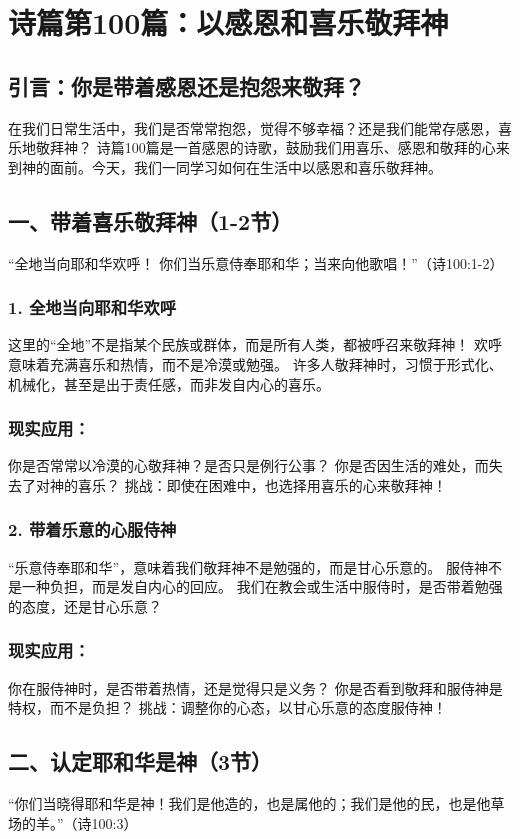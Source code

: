 \documentclass[a4paper, 12pt]{article}
\begin{document}
\section{诗篇第100篇：以感恩和喜乐敬拜神}
\subsection*{引言：你是带着感恩还是抱怨来敬拜？}
在我们日常生活中，我们是否常常抱怨，觉得不够幸福？还是我们能常存感恩，喜乐地敬拜神？
诗篇100篇是一首感恩的诗歌，鼓励我们用喜乐、感恩和敬拜的心来到神的面前。今天，我们一同学习如何在生活中以感恩和喜乐敬拜神。

\subsection*{一、带着喜乐敬拜神（1-2节）}
“全地当向耶和华欢呼！ 你们当乐意侍奉耶和华；当来向他歌唱！”（诗100:1-2）

\subsubsection*{1. 全地当向耶和华欢呼}
这里的“全地”不是指某个民族或群体，而是所有人类，都被呼召来敬拜神！
欢呼意味着充满喜乐和热情，而不是冷漠或勉强。
许多人敬拜神时，习惯于形式化、机械化，甚至是出于责任感，而非发自内心的喜乐。
\subsubsection*{现实应用：}

你是否常常以冷漠的心敬拜神？是否只是例行公事？
你是否因生活的难处，而失去了对神的喜乐？
挑战：即使在困难中，也选择用喜乐的心来敬拜神！

\subsubsection*{2. 带着乐意的心服侍神}
“乐意侍奉耶和华”，意味着我们敬拜神不是勉强的，而是甘心乐意的。
服侍神不是一种负担，而是发自内心的回应。
我们在教会或生活中服侍时，是否带着勉强的态度，还是甘心乐意？
\subsubsection*{现实应用：}

你在服侍神时，是否带着热情，还是觉得只是义务？
你是否看到敬拜和服侍神是特权，而不是负担？
挑战：调整你的心态，以甘心乐意的态度服侍神！

\subsection*{二、认定耶和华是神（3节）}
“你们当晓得耶和华是神！我们是他造的，也是属他的；我们是他的民，也是他草场的羊。”（诗100:3）
\end{document}
